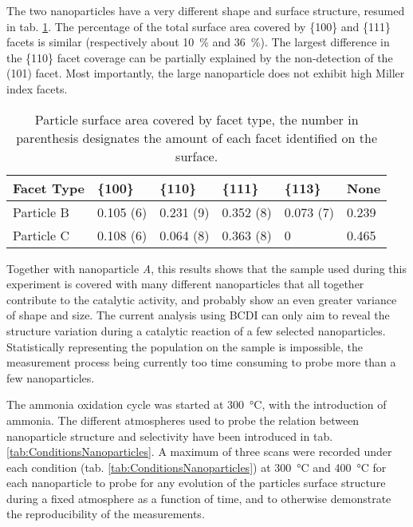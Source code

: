The two nanoparticles have a very different shape and surface structure, resumed in tab. \ref{tab:FacetCoverage}.
The percentage of the total surface area covered by \{100\} and \{111\} facets is similar (respectively about \qty{10}{\percent} and \qty{36}{\percent}).
The largest difference in the \{110\} facet coverage can be partially explained by the non-detection of the (101) facet.
Most importantly, the large nanoparticle does not exhibit high Miller index facets.

\begin{table}[!htb]
    \centering
    \begin{tabular}{@{}llllll@{}}
    \toprule
    Facet Type & \{100\} & \{110\} & \{111\} & \{113\} & None \\
    \midrule
    Particle B & 0.105 (6) & 0.231 (9) & 0.352 (8) & 0.073 (7) & 0.239 \\
    Particle C & 0.108 (6) & 0.064 (8) & 0.363 (8) & 0 & 0.465 \\
    \bottomrule
    \end{tabular}%
    \caption{
        Particle surface area covered by facet type, the number in parenthesis designates the amount of each facet identified on the surface.
    }
    \label{tab:FacetCoverage}
\end{table}

Together with nanoparticle \textit{A}, this results shows that the sample used during this experiment is covered with many different nanoparticles that all together contribute to the catalytic activity, and probably show an even greater variance of shape and size.
The current analysis using BCDI can only aim to reveal the structure variation during a catalytic reaction of a few selected nanoparticles.
Statistically representing the population on the sample is impossible, the measurement process being currently too time consuming to probe more than a few nanoparticles.

The ammonia oxidation cycle was started at \qty{300}{\degreeCelsius}, with the introduction of ammonia.
The different atmospheres used to probe the relation between nanoparticle structure and selectivity have been introduced in tab. \ref{tab:ConditionsNanoparticles}.
A maximum of three scans were recorded under each condition (tab. \ref{tab:ConditionsNanoparticles}) at \qty{300}{\degreeCelsius} and \qty{400}{\degreeCelsius} for each nanoparticle to probe for any evolution of the particles surface structure during a fixed atmosphere as a function of time, and to otherwise demonstrate the reproducibility of the measurements.

